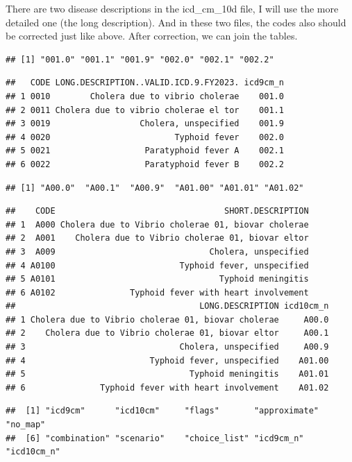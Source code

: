 \documentclass[
]{article}
\begin{document}
There are two disease descriptions in the icd\_cm\_10d file, I will use
the more detailed one (the long description). And in these two files,
the codes also should be corrected just like above. After correction, we
can join the tables.

\begin{verbatim}
## [1] "001.0" "001.1" "001.9" "002.0" "002.1" "002.2"
\end{verbatim}

\begin{verbatim}
##   CODE LONG.DESCRIPTION..VALID.ICD.9.FY2023. icd9cm_n
## 1 0010        Cholera due to vibrio cholerae    001.0
## 2 0011 Cholera due to vibrio cholerae el tor    001.1
## 3 0019                  Cholera, unspecified    001.9
## 4 0020                         Typhoid fever    002.0
## 5 0021                   Paratyphoid fever A    002.1
## 6 0022                   Paratyphoid fever B    002.2
\end{verbatim}

\begin{verbatim}
## [1] "A00.0"  "A00.1"  "A00.9"  "A01.00" "A01.01" "A01.02"
\end{verbatim}

\begin{verbatim}
##    CODE                                  SHORT.DESCRIPTION
## 1  A000 Cholera due to Vibrio cholerae 01, biovar cholerae
## 2  A001    Cholera due to Vibrio cholerae 01, biovar eltor
## 3  A009                               Cholera, unspecified
## 4 A0100                         Typhoid fever, unspecified
## 5 A0101                                 Typhoid meningitis
## 6 A0102               Typhoid fever with heart involvement
##                                     LONG.DESCRIPTION icd10cm_n
## 1 Cholera due to Vibrio cholerae 01, biovar cholerae     A00.0
## 2    Cholera due to Vibrio cholerae 01, biovar eltor     A00.1
## 3                               Cholera, unspecified     A00.9
## 4                         Typhoid fever, unspecified    A01.00
## 5                                 Typhoid meningitis    A01.01
## 6               Typhoid fever with heart involvement    A01.02
\end{verbatim}

\begin{verbatim}
##  [1] "icd9cm"      "icd10cm"     "flags"       "approximate" "no_map"     
##  [6] "combination" "scenario"    "choice_list" "icd9cm_n"    "icd10cm_n"
\end{verbatim}
\end{document}
